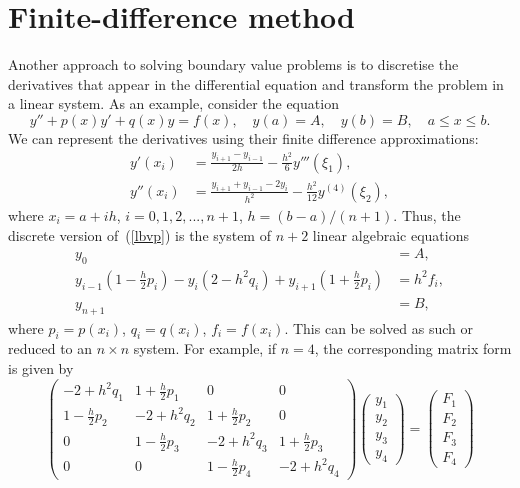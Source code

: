 \section{Finite-difference method}

Another approach to solving boundary value problems is to discretise
the derivatives that appear in the differential equation and transform
the problem in a linear system.  As an example, consider the equation
%
\begin{equation}
  y'' + p(x) y' + q(x) y = f(x), \quad y(a)=A, \quad y(b)=B,
  \quad a \le x \le b.\label{lbvp}
\end{equation}
%
We can represent the derivatives using their finite difference
approximations:
%
\begin{subequations}
  \label{er}
  \begin{align}
    y'(x_i) &= \frac{y_{i+1}-y_{i-1}}{2h} -
    \frac{h^2}{6} y'''(\xi_1), \\
    y''(x_i) &=  \frac{y_{i+1}+y_{i-1}-2 y_i}{h^2} -
    \frac{h^2}{12}y^{(4)}(\xi_2),
  \end{align}
\end{subequations}
%
where $x_i=a+i h$, $i=0,1,2,...,n+1$, $h=(b-a)/(n+1)$. Thus, the
discrete version of~(\ref{lbvp}) is the system of $n+2$ linear
algebraic equations
%
\begin{align*}
  y_0 &=A, \\
  y_{i-1} \left ( 1 - \frac{h}{2} p_i \right ) -
  y_i \left ( 2 - h^2 q_i \right ) +
  y_{i+1} \left (1 + \frac{h}{2} p_i \right )  &= h^2 f_i , \\
  y_{n+1} &=B,
\end{align*}
%
where $p_i=p(x_i)$, $q_i=q(x_i)$, $f_i=f(x_i)$.  This can be solved as
such or reduced to an $n \times n$ system.  For example, if $n=4$, the
corresponding matrix form is given by
%
\begin{equation*}
  \begin{pmatrix}
    -2 + h^2 q_1 & 1 + \frac{h}{2} p_1 & 0 & 0 \\
    1 - \frac{h}{2} p_2 & -2  + h^2 q_2 & 1 + \frac{h}{2} p_2 & 0\\
    0 & 1 - \frac{h}{2} p_3 & -2  + h^2 q_3 & 1 + \frac{h}{2} p_3 \\
    0 & 0 & 1 - \frac{h}{2} p_4 & -2  + h^2 q_4
  \end{pmatrix}
  \begin{pmatrix} y_1\\ y_2\\ y_3\\ y_4 \end{pmatrix} =
  \begin{pmatrix} F_1\\ F_2\\ F_3\\ F_4 \end{pmatrix}
\end{equation*}
